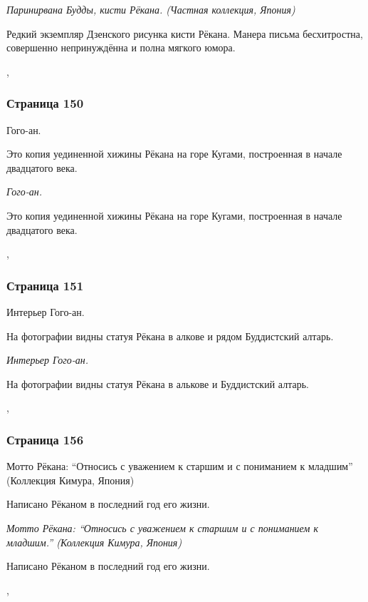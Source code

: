 \begin{ver}[1]\it
Паринирвана Будды, кисти Рёкана. (Частная коллекция, Япония)
\end{ver}
\begin{ver}[1]
Редкий экземпляр Дзенского рисунка кисти Рёкана. Манера письма
бесхитростна, совершенно непринуждённа и полна мягкого юмора.
\end{ver}
\sep
 
\subsubsection{Страница 150}
\begin{ver}
Гого-ан. 

Это копия уединенной хижины Рёкана на горе Кугами, построенная в
начале двадцатого века.
\end{ver}

\begin{ver}[1]\it
Гого-ан. 
\end{ver}

\begin{ver}[1]
Это копия уединенной хижины Рёкана на горе Кугами, построенная в
начале двадцатого века.
\end{ver}
\sep
 
\subsubsection{Страница 151} 
\begin{ver}
Интерьер Гого-ан.

На фотографии видны статуя Рёкана в алкове и рядом Буддистский алтарь.
\end{ver}

\begin{ver}[1]\it
Интерьер Гого-ан.
\end{ver}
\begin{ver}[1]
На фотографии видны статуя Рёкана в алькове и Буддистский алтарь.
\end{ver}
\sep

\subsubsection{Страница 156}
\begin{ver}
Мотто Рёкана: ``Относись с уважением к старшим и с пониманием к
младшим'' (Коллекция Кимура, Япония)

Написано Рёканом в последний год его жизни.
\end{ver}

\begin{ver}[1]\it
Мотто Рёкана: ``Относись с уважением к старшим и с пониманием к
младшим.'' (Коллекция Кимура, Япония)
\end{ver}

\begin{ver}[1]
  Написано Рёканом в последний год его жизни.
\end{ver}
\sep

